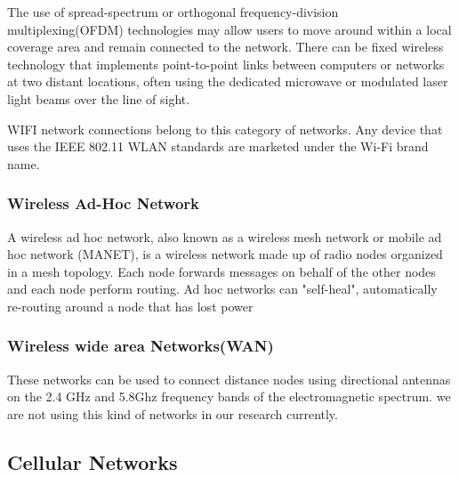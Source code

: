   \vspace{12pt}
  
  The use of spread-spectrum or orthogonal frequency-division multiplexing(OFDM) technologies may allow users to move around within a local coverage area and remain connected to the network. There can be fixed wireless technology that implements point-to-point links between computers or networks at two distant locations, often using the dedicated microwave or modulated laser light beams over the line of sight.
  
    \vspace{12pt}
    
 WIFI  network connections belong to this category of networks. Any device that uses the IEEE 802.11 WLAN standards are marketed under the Wi-Fi brand name.

 \vspace{12pt}





 \subsubsection*{Wireless Ad-Hoc Network}
  \vspace{12pt}
 A wireless ad hoc network, also known as a wireless mesh network or mobile ad hoc network (MANET), is a wireless network made up of radio nodes organized in a mesh topology. Each node forwards messages on behalf of the other nodes and each node perform routing. Ad hoc networks can "self-heal", automatically re-routing around a node that has lost power
 

 \vspace{12pt}





 \subsubsection*{Wireless wide area Networks(WAN)}
  \vspace{12pt}
 
 These networks can be used to connect distance nodes using directional antennas on the 2.4 GHz and 5.8Ghz frequency bands of the electromagnetic spectrum. we are not using this kind of networks in our research currently. 

 \vspace{12pt}


\subsection{Cellular Networks}

